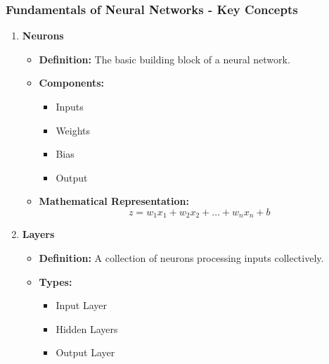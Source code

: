\documentclass[aspectratio=169]{beamer}
\begin{document}
\begin{frame}[fragile]
    \frametitle{Fundamentals of Neural Networks - Key Concepts}
    
    \begin{enumerate}
        \item \textbf{Neurons}
        \begin{itemize}
            \item \textbf{Definition:} The basic building block of a neural network.
            \item \textbf{Components:}
            \begin{itemize}
                \item Inputs
                \item Weights
                \item Bias
                \item Output
            \end{itemize}
            \item \textbf{Mathematical Representation:}
            \begin{equation}
                z = w_1x_1 + w_2x_2 + \ldots + w_nx_n + b
            \end{equation}
        \end{itemize}
        
        \item \textbf{Layers}
        \begin{itemize}
            \item \textbf{Definition:} A collection of neurons processing inputs collectively.
            \item \textbf{Types:}
            \begin{itemize}
                \item Input Layer
                \item Hidden Layers
                \item Output Layer
            \end{itemize}
        \end{itemize}
    \end{enumerate}
\end{frame}
\end{document}
